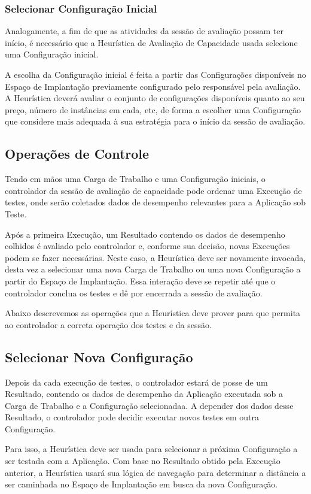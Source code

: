 \subsubsection{Selecionar Configuração Inicial}
Analogamente, a fim de que as atividades da sessão de avaliação possam ter início,
é necessário que a Heurística de Avaliação de Capacidade usada selecione uma
Configuração inicial.

A escolha da Configuração inicial é feita a partir das Configurações disponíveis
no Espaço de Implantação previamente configurado pelo responsável pela avaliação.
A Heurística deverá avaliar o conjunto de configurações disponíveis quanto ao seu
preço, número de instâncias em cada, etc, de forma a escolher uma Configuração 
que considere mais adequada à sua estratégia para o início da sessão de avaliação.

\subsection{Operações de Controle}
Tendo em mãos uma Carga de Trabalho e uma Configuração iniciais, o controlador
da sessão de avaliação de capacidade pode ordenar uma Execução de testes, onde
serão coletados dados de desempenho relevantes para a Aplicação sob Teste.

Após a primeira Execução, um Resultado contendo os dados de desempenho colhidos 
é avaliado pelo controlador e, conforme sua decisão, novas Execuções podem se 
fazer necessárias. Neste caso, a Heurística deve ser novamente invocada, desta 
vez a selecionar uma nova Carga de Trabalho ou uma nova Configuração a partir do
Espaço de Implantação. Essa interação deve se repetir até que o controlador 
conclua os testes e dê por encerrada a sessão de avaliação.

Abaixo descrevemos as operações que a Heurística deve prover para que permita ao
controlador a correta operação dos testes e da sessão.

\subsection{Selecionar Nova Configuração}
Depois da cada execução de testes, o controlador estará de posse de um Resultado,
contendo os dados de desempenho da Aplicação executada sob a Carga de Trabalho e
a Configuração selecionadaa. A depender dos dados desse Resultado, o controlador
pode decidir executar novos testes em outra Configuração.

Para isso, a Heurística deve ser usada para selecionar a próxima Configuração a 
ser testada com a Aplicação. Com base no Resultado obtido pela Execução anterior,
a Heurística usará sua lógica de navegação para determinar a distância a ser 
caminhada no Espaço de Implantação em busca da nova Configuração.

